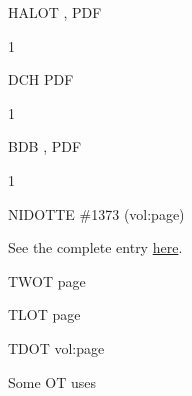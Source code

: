 				\begin{compactdesc}
				
					\item[HALOT , PDF ] \phantom{.}%
						\begin{compactitem}
							\item[1]
						\end{compactitem}
						
					\item[DCH PDF ] \phantom{.} %
						\begin{compactitem}
							\item[1]
						\end{compactitem}
						
					\item[BDB , PDF ] \phantom{.}
						\begin{compactitem}
							\item[1]
						\end{compactitem}
						
					\item[NIDOTTE \#1373 (vol:page)] \phantom{.}
						\begin{compactitem}
							\item See the complete entry \href{https://drive.google.com/file/d/1D-J0OgczQRkr9M1DLYwltULndHSFVB-E/view?usp=sharing}{here}.
						\end{compactitem}
						
					\item[TWOT page] \phantom{.}
						\begin{compactitem}
							\item 
						\end{compactitem}
						
					\item[TLOT page] \phantom{.}
						\begin{compactitem}
							\item 
						\end{compactitem}
						
					\item[TDOT vol:page] \phantom{.}
						\begin{compactitem}
							\item 
						\end{compactitem}
						
				\end{compactdesc}
				
				\begin{compactdesc}
					\item[Some OT uses] \phantom{.} %
						\begin{compactdesc}
							\item[]
						\end{compactdesc}
				\end{compactdesc}
			
